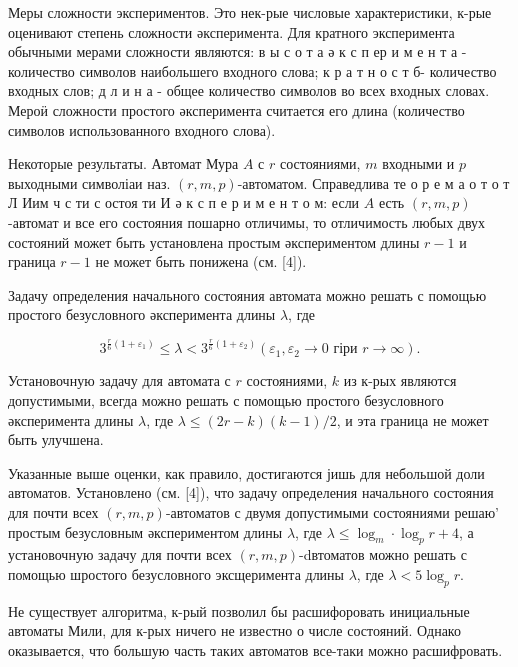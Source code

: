 \documentclass[10pt]{article}
\begin{document}
Меры сложности экспериментов. Это нек-рые числовые характеристики, к-рые оценивают степень сложности әксперимента. Для кратного эксперимента обычными мерами сложности являются: в ы с о т а ә к с п ер и м е н т а - количество символов наибольшего входного слова; к р а т н о с т б- количество входных слов; д л и н а - общее количество символов во всех входных словах. Мероӥ сложности простого әксперимента считается его длина (количество символов использованного входного слова).



Некоторые результаты. Автомат Мура $A$ с $r$ состояниями, $m$ входными и $p$ выходными символіаи наз. $(r, m, p)$-автоматом. Справедлива те о р е м а $о$ т о т Л Иим ч с ти с остоя ти И ә к с п е р и м е н т о м: если $A$ есть $(r, m, p)$-автомат и все его состояния пошарно отличимы, то отличимость любых двух состояний может быть установлена простым әкспериментом длины $r-1$ и граница $r-1$ не может быть понижена (см. [4]).



Задачу определения начального состояния автомата можно решать с помощью простого безусловного әксперимента длины $\lambda$, где



\[

3^{\frac{r}{6}\left(1+\varepsilon_{1}\right)} \leqslant \lambda<3^{\frac{r}{6}\left(1+\varepsilon_{2}\right)}\left(\varepsilon_{1}, \varepsilon_{2} \rightarrow 0 \text { гіри } r \longrightarrow \infty\right) .

\]



Установочную задачу для автомата с $r$ состояниями, $k$ из к-рых являются допустимыми, всегда можно решать с помощью простого безусловного әксперимента длины $\lambda$, где $\lambda \leqslant(2 r-k)(k-1) / 2$, и эта граница не может быть улучшена.



Указанные выше оценки, как правило, достигаются јишь для небольшой доли автоматов. Установлено (см. [4]), что задачу определения начального состояния для почти всех $(r, m, p)$-автоматов с двумя допустимыми состояниями решаю' простым безусловным әкспериментом длины $\lambda$, где $\lambda \leqslant \log _{m} \cdot \log _{p} r+4$, а установочную задачу для почти всех $(r, m, p)$-dвтоматов можно решать с помощью шростого безусловного эксщеримента длины $\lambda$, где $\lambda<5 \log _{p} r$.



Не существует алгоритма, к-рый позволил бы расшифоровать инициальные автоматы Мили, для к-рых ничего не известно о числе состояний. Однако оказывается, что большую часть таких автоматов все-таки можно расшифровать.
\end{document}
